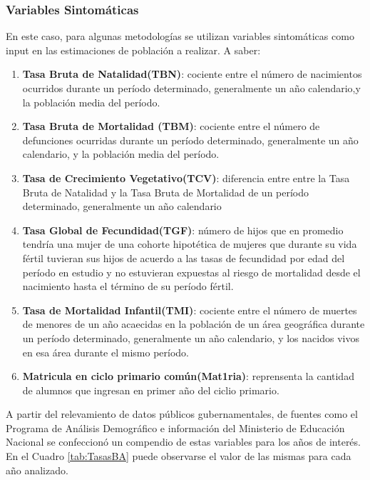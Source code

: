 \documentclass{article}
\theoremstyle{mytheoremstyle}
\theoremstyle{mytheoremstyle}
\theoremstyle{myproblemstyle}
\begin{document}
 \subsubsection{Variables Sintomáticas}
 En este caso, para algunas metodologías se utilizan variables sintomáticas como input en las
  estimaciones de población a realizar. A saber:
  \begin{enumerate}
     \item \textbf{Tasa Bruta de Natalidad(TBN)}: cociente entre el número de nacimientos ocurridos durante un período determinado, 
   generalmente un año calendario,y la población media del período.
    \item	\textbf{Tasa Bruta de Mortalidad (TBM)}:  cociente entre el número de defunciones ocurridas durante un período determinado, 
    generalmente un año calendario, y la población media del período.
        \item \textbf{Tasa de Crecimiento Vegetativo(TCV)}: diferencia entre entre la Tasa Bruta de Natalidad 
    y la Tasa Bruta de Mortalidad de un período determinado, generalmente un año calendario
    \item \textbf{Tasa Global de Fecundidad(TGF)}: número de hijos que en promedio tendría una mujer de
    una cohorte hipotética de mujeres que durante su vida fértil tuvieran sus hijos de acuerdo 
    a las tasas de fecundidad por edad del período en estudio y no estuvieran expuestas al
    riesgo de mortalidad desde el nacimiento hasta el término de su período fértil.
     \item \textbf{Tasa de Mortalidad Infantil(TMI)}: cociente entre el número de muertes de menores de un año acaecidas 
    en la población de un área geográfica durante un período determinado, 
    generalmente un año calendario, y los nacidos vivos en esa área durante el mismo período.
     \item \textbf{Matricula en ciclo primario común(Mat1ria)}: reprensenta la cantidad de alumnos
    que ingresan en primer año del ciclio primario.
   \end{enumerate}

 A partir del relevamiento de datos públicos gubernamentales, de fuentes como el  Programa de Análisis Demográfico  e 
   información del Ministerio de Educación Nacional   se confeccionó un compendio de estas variables para los años de interés.
   En el Cuadro \ref{tab:TasasBA} puede observarse el valor de las mismas para cada año analizado.\newline
 
\end{document}
